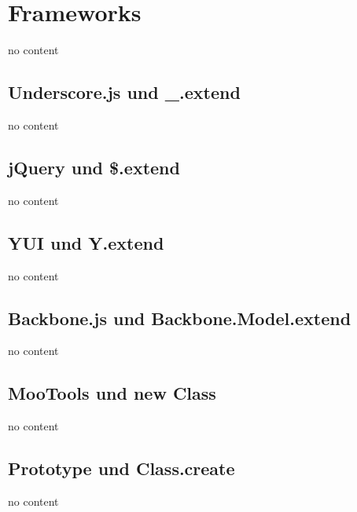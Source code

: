 \section{Frameworks}

\begin{frame}
  no content
\end{frame}

\subsection{Underscore.js und \_.extend}

\begin{frame}
  no content
\end{frame}

\subsection{jQuery und \$.extend}

\begin{frame}
  no content
\end{frame}

\subsection{YUI und Y.extend}

\begin{frame}
  no content
\end{frame}

\subsection{Backbone.js und Backbone.Model.extend}

\begin{frame}
  no content
\end{frame}

\subsection{MooTools und new Class}

\begin{frame}
  no content
\end{frame}

\subsection{Prototype und Class.create}

\begin{frame}
  no content
\end{frame}

